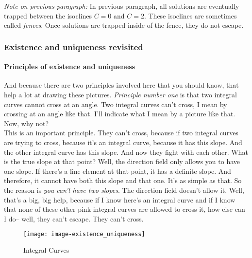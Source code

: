 \emph{\color{orange}Note on previous paragraph: }
In previous paragraph, all solutions are eventually trapped between the isoclines
$C = 0$ and $C = 2$.
These isoclines are sometimes called \emph{\color{blue}fences}.
Once solutions are trapped inside of the fence, they do not escape.

\clearpage

\subsubsection{Existence and uniqueness revisited}
\paragraph{Principles of existence and uniqueness}
And because there are two principles involved here
that you should know, that help a lot at drawing these pictures.
\emph{Principle number one} is that two integral curves cannot cross at an angle.
Two integral curves can't cross, I mean by crossing at an angle like that.
I'll indicate what I mean by a picture like that.
Now, why not?\\

This is an important principle.
They can't cross, because if two integral curves
are trying to cross, because it's an integral curve,
because it has this slope.
And the other integral curve has this slope.
And now they fight with each other.
What is the true slope at that point?
Well, the direction field only allows you to have one slope.
If there's a line element at that point,
it has a definite slope. And therefore, it cannot have both this slope and that one.
It's as simple as that.
So the reason is \emph{you can't have two slopes}.
The direction field doesn't allow it.
Well, that's a big, big help, because if I know here's
an integral curve and if I know that none of these other pink integral curves are allowed to cross it,
how else can I do-- well, they can't escape. They can't cross.

\begin{wrapfigure}{r}{5.5cm}
  \texttt{[image: image-existence\_uniqueness]}
  \caption{Integral Curves}
\end{wrapfigure}

